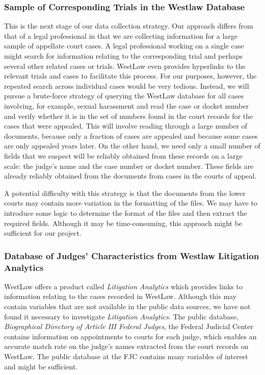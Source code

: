 \documentclass[11pt]{paper}
\begin{document}
\subsubsection{Sample of Corresponding Trials 
	in the Westlaw Database}

This is the next stage of our data collection strategy. 
Our approach differs from that of a legal professional in that
we are collecting information for a large sample of appellate court cases.  
A legal professional working on a single case might search for information relating to the corresponding trial and perhaps several other related cases or trials. 
WestLaw even provides hyperlinks to the relevant trials and cases to facilitate this process. 
For our purposes, however, the repeated search across individual cases would be very tedious. 
Instead, we will pursue a brute-force strategy of querying the WestLaw database for all cases involving, for example, sexual harassment
and read the case or docket number and verify whether it is in the set of numbers found in the court records for the cases that were appealed. 
This will involve reading through a large number of documents, 
because only a fraction of cases are appealed 
and because some cases are only appealed years later. 
On the other hand, we need only a small number of fields that
we suspect will be reliably obtained from these records on a large scale:
the judge's name and the case number or docket number. 
These fields are already reliably obtained from the documents from cases in the courts of appeal. 

A potential difficulty with this strategy is that
the documents from the lower courts may contain more variation
in the formatting of the files. 
We may have to introduce some logic to determine the format of the files
and then extract the required fields. 
Although it may be time-consuming, this approach might be sufficient
for our project. 





\subsubsection{Database of Judges' Characteristics 
	from Westlaw Litigation Analytics}

WestLaw offers a product called {\it Litigation Analytics}
which provides links to information relating to the cases recorded in WestLaw. 
Although this may contain variables that are not available in the public data sources, we have not found it necessary to investigate {\it Litigation Analytics}.
The public database, 
{\it Biographical Directory of Article III Federal Judges}, 
the Federal Judicial Center contains information
on appointments to courts for each judge, 
which enables an accurate match rate on the judge's names extracted from the court records on WestLaw. 
The public database at the FJC contains many variables of interest
and might be sufficient.
\end{document}
